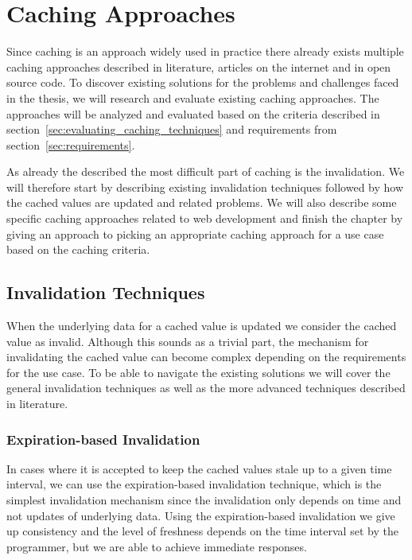 \chapter{Caching Approaches}
\label{chapter:caching}

Since caching is an approach widely used in practice there already exists multiple caching approaches described in literature, articles on the internet and in open source code. To discover existing solutions for the problems and challenges faced in the thesis, we will research and evaluate existing caching approaches. The approaches will be analyzed and evaluated based on the criteria described in section~\ref{sec:evaluating_caching_techniques} and  requirements from section~\ref{sec:requirements}.

As already the described the most difficult part of caching is the invalidation. We will therefore start by describing existing invalidation techniques followed by how the cached values are updated and related problems. We will also describe some specific caching approaches related to web development and finish the chapter by giving an approach to picking an appropriate caching approach for a use case based on the caching criteria.

\section{Invalidation Techniques}
\label{sec:invalidation_techniques}

When the underlying data for a cached value is updated we consider the cached value as invalid. Although this sounds as a trivial part, the mechanism for invalidating the cached value can become complex depending on the requirements for the use case. To be able to navigate the existing solutions we will cover the general invalidation techniques as well as the more advanced techniques described in literature.


\subsection{Expiration-based Invalidation}
\label{subsec:expiration_based_invalidation}

In cases where it is accepted to keep the cached values stale up to a given time interval, we can use the expiration-based invalidation technique, which is the simplest invalidation mechanism since the invalidation only depends on time and not updates of underlying data. Using the expiration-based invalidation we give up consistency and the level of freshness depends on the time interval set by the programmer, but we are able to achieve immediate responses.

